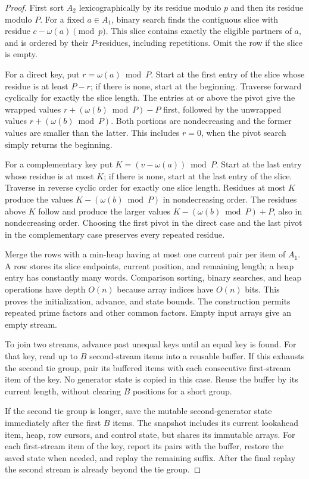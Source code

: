 \begin{proof}
First sort $A_2$ lexicographically by its residue modulo $p$ and
then its residue modulo $P$. For a fixed $a\in A_1$, binary
search finds the contiguous slice with residue
$c-\omega(a)\pmod p$. This slice contains exactly the eligible
partners of $a$, and is ordered by their $P$-residues, including
repetitions. Omit the row if the slice is empty.

For a direct key, put $r=\omega(a)\bmod P$. Start at the first
entry of the slice whose residue is at least $P-r$; if there is
none, start at the beginning. Traverse forward cyclically for exactly
the slice length. The entries at or above the pivot give the wrapped
values $r+(\omega(b)\bmod P)-P$ first, followed by the unwrapped
values $r+(\omega(b)\bmod P)$.
Both portions are nondecreasing and the former values are smaller
than the latter. This includes $r=0$, when the pivot search simply
returns the beginning.

For a complementary key put $K=(v-\omega(a))\bmod P$.
Start at the last entry whose residue is at most $K$; if there is
none, start at the last entry of the slice. Traverse in reverse
cyclic order for exactly one slice length. Residues at most $K$
produce the values $K-(\omega(b)\bmod P)$ in nondecreasing
order. The residues above $K$ follow and produce the larger values
$K-(\omega(b)\bmod P)+P$, also in nondecreasing order.
Choosing the first pivot in the direct case and the last pivot in
the complementary case preserves every repeated residue.

Merge the rows with a min-heap having at most one current pair per
item of $A_1$. A row stores its slice endpoints, current position,
and remaining length; a heap entry has constantly many words.
Comparison sorting, binary searches, and heap operations have depth
$O(n)$ because array indices have $O(n)$ bits. This proves the
initialization, advance, and state bounds. The construction permits
repeated prime factors and other common factors. Empty input arrays
give an empty stream.

To join two streams, advance past unequal keys until an equal key is
found. For that key, read up to $B$ second-stream items into a reusable
buffer. If this exhausts the second tie group, pair its buffered items
with each consecutive first-stream item of the key. No generator state
is copied in this case. Reuse the buffer by its current length, without
clearing $B$ positions for a short group.

If the second tie group is longer, save the mutable second-generator
state immediately after the first $B$ items. The snapshot includes
its current lookahead item, heap, row cursors, and control state, but
shares its immutable arrays. For each first-stream item of the key,
report its pairs with the buffer, restore the saved state when needed,
and replay the remaining suffix. After the final replay the second
stream is already beyond the tie group.


\end{proof}
